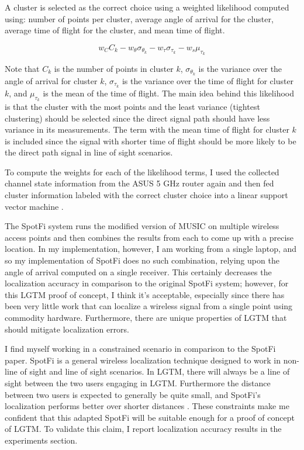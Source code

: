 \documentclass[12pt]{report}
\begin{document}
A cluster is selected as the correct choice using a weighted likelihood computed using: number of points per cluster, average angle of arrival for the cluster, average time of flight for the cluster, and mean time of flight. 

$$w_{C} C_k - w_{\theta} \sigma_{\theta_{k}} - w_{\tau} \sigma_{\tau_{k}} - w_{s} \mu_{\tau_{k}}$$

Note that $C_k$ is the number of points in cluster $k$, $\sigma_{\theta_{k}}$ is the variance over the angle of arrival for cluster $k$, $\sigma_{\tau_{k}}$ is the variance over the time of flight for cluster $k$, and $\mu_{\tau_{k}}$ is the mean of the time of flight. The main idea behind this likelihood is that the cluster with the most points and the least variance (tightest clustering) should be selected since the direct signal path should have less variance in its measurements. The term with the mean time of flight for cluster $k$ is included since the signal with shorter time of flight should be more likely to be the direct path signal in line of sight scenarios. \par

To compute the weights for each of the likelihood terms, I used the collected channel state information from the ASUS 5 GHz router again and then fed cluster information labeled with the correct cluster choice into a linear support vector machine \cite{SvmTutorialBurges1998}. \par


The SpotFi system runs the modified version of MUSIC on multiple wireless access points and then combines the results from each to come up with a precise location. In my implementation, however, I am working from a single laptop, and so my implementation of SpotFi does no such combination, relying upon the angle of arrival computed on a single receiver. This certainly decreases the localization accuracy in comparison to the original SpotFi system; however, for this LGTM proof of concept, I think it's acceptable, especially since there has been very little work that can localize a wireless signal from a single point using commodity hardware. Furthermore, there are unique properties of LGTM that should mitigate localization errors. \par

I find myself working in a constrained scenario in comparison to the SpotFi paper. SpotFi is a general wireless localization technique designed to work in non-line of sight and line of sight scenarios. In LGTM, there will always be a line of sight between the two users engaging in LGTM. Furthermore the distance between two users is expected to generally be quite small, and SpotFi's localization performs better over shorter distances \cite{SpotFiKotaru2015}. These constraints make me confident that this adapted SpotFi will be suitable enough for a proof of concept of LGTM. To validate this claim, I report localization accuracy results in the experiments section. \par
\end{document}
